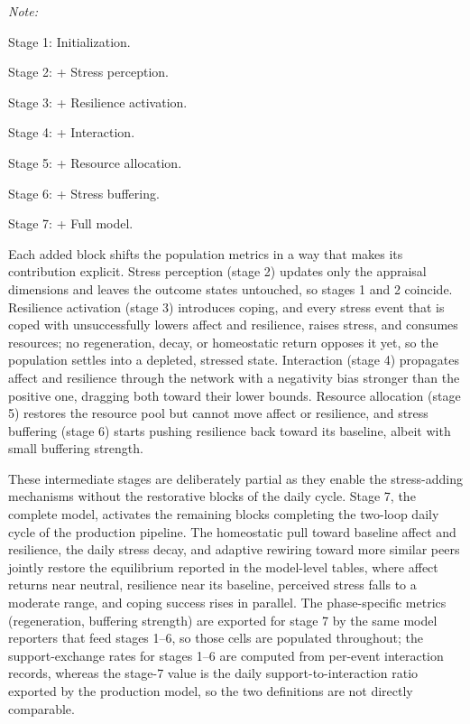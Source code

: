 \documentclass[
  letterpaper,
  DIV=11,
  numbers=noendperiod]{scrartcl}
\begin{document}
\begin{landscape}
\begin{table}[!h]
{\begin{threeparttable}
\begin{tabularx}{\linewidth}
\bottomrule
\end{tabularx}
\begin{tablenotes}
\item \textit{Note:} 
\item Stage 1: Initialization.
\item Stage 2: + Stress perception.
\item Stage 3: + Resilience activation.
\item Stage 4: + Interaction.
\item Stage 5: + Resource allocation.
\item Stage 6: + Stress buffering.
\item Stage 7: + Full model.
\end{tablenotes}
\end{threeparttable}}
\end{table}

\end{landscape}

Each added block shifts the population metrics in a way that makes its
contribution explicit. Stress perception (stage 2) updates only the
appraisal dimensions and leaves the outcome states untouched, so stages
1 and 2 coincide. Resilience activation (stage 3) introduces coping, and
every stress event that is coped with unsuccessfully lowers affect and
resilience, raises stress, and consumes resources; no regeneration,
decay, or homeostatic return opposes it yet, so the population settles
into a depleted, stressed state. Interaction (stage 4) propagates affect
and resilience through the network with a negativity bias stronger than
the positive one, dragging both toward their lower bounds. Resource
allocation (stage 5) restores the resource pool but cannot move affect
or resilience, and stress buffering (stage 6) starts pushing resilience
back toward its baseline, albeit with small buffering strength.

These intermediate stages are deliberately partial as they enable the
stress-adding mechanisms without the restorative blocks of the daily
cycle. Stage 7, the complete model, activates the remaining blocks
completing the two-loop daily cycle of the production pipeline. The
homeostatic pull toward baseline affect and resilience, the daily stress
decay, and adaptive rewiring toward more similar peers jointly restore
the equilibrium reported in the model-level tables, where affect returns
near neutral, resilience near its baseline, perceived stress falls to a
moderate range, and coping success rises in parallel. The phase-specific
metrics (regeneration, buffering strength) are exported for stage 7 by
the same model reporters that feed stages 1--6, so those cells are
populated throughout; the support-exchange rates for stages 1--6 are
computed from per-event interaction records, whereas the stage-7 value
is the daily support-to-interaction ratio exported by the production
model, so the two definitions are not directly comparable.
\end{document}
